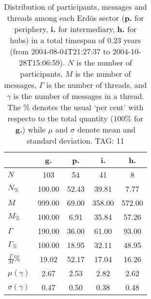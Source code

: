 \begin{table}[h!]
\begin{center}
\begin{tabular}{| l || c | c | c | c |}\hline
 & {\bf g.} & {\bf p.} & {\bf i.} & {\bf h.} \\\hline\hline
$N$ & 103  & 54  & 41  & 8 \\
$N_{\%}$ & 100.00  & 52.43  & 39.81  & 7.77 \\\hline
$M$ & 999.00  & 69.00  & 358.00  & 572.00 \\
$M_{\%}$ & 100.00  & 6.91  & 35.84  & 57.26 \\\hline
$\Gamma$ & 190.00  & 36.00  & 61.00  & 93.00 \\
$\Gamma_{\%}$ & 100.00  & 18.95  & 32.11  & 48.95 \\\hline
$\frac{\Gamma}{M}\%$ & 19.02  & 52.17  & 17.04  & 16.26 \\
$\mu(\gamma)$ & 2.67  & 2.53  & 2.82  & 2.62 \\
$\sigma(\gamma)$ & 0.47  & 0.50  & 0.38  & 0.48 \\\hline
\end{tabular}
\caption{Distribution of participants, messages and threads among each Erd\"os sector ({\bf p.} for periphery, {\bf i.} for intermediary, 
    {\bf h.} for hubs) in a total timespan of 0.23 years (from 2004-08-04T21:27:37 to 2004-10-28T15:06:59). $N$ is the number of participants, $M$ is the number of messages, $\Gamma$ is the number of threads, and $\gamma$ is the number of messages in a thread.
    The \% denotes the usual `per cent' with respecto to the total quantity ($100\%$ for {\bf g.})
    while $\mu$ and $\sigma$ denote mean and standard deviation. TAG: 11}
\end{center}
\end{table}